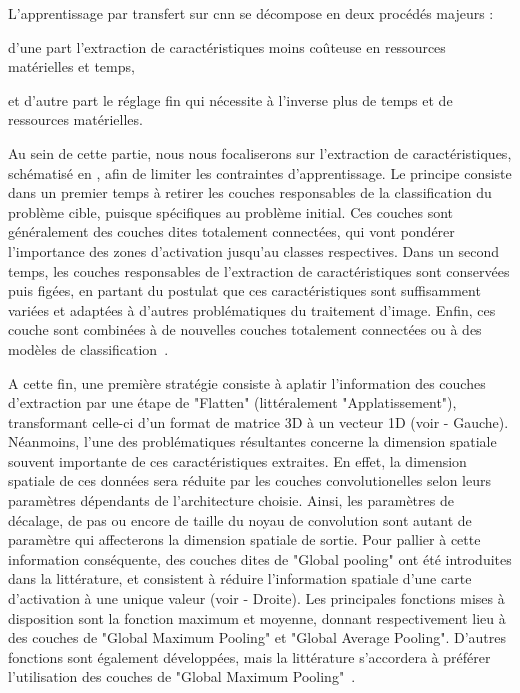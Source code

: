 L'apprentissage par transfert sur \gls{cnn} se décompose en deux procédés majeurs : 
\begin{inlinerate}
    \item d'une part l'extraction de caractéristiques moins coûteuse en ressources matérielles et temps,
    \item et d'autre part le réglage fin qui nécessite à l'inverse plus de temps et de ressources matérielles. 
\end{inlinerate}
Au sein de cette partie, nous nous focaliserons sur l'extraction de caractéristiques, schématisé en , afin de limiter les contraintes d'apprentissage. Le principe consiste dans un premier temps à retirer les couches responsables de la classification du problème cible, puisque spécifiques au problème initial. Ces couches sont généralement des couches dites totalement connectées, qui vont pondérer l'importance des zones d'activation jusqu'au classes respectives. Dans un second temps, les couches responsables de l'extraction de caractéristiques sont conservées puis figées, en partant du postulat que ces caractéristiques sont suffisamment variées et adaptées à d'autres problématiques du traitement d'image. Enfin, ces couche sont combinées à de nouvelles couches totalement connectées ou à des modèles de classification~\cite{Litjens2017}.\par 

A cette fin, une première stratégie consiste à aplatir l'information des couches d'extraction par une étape de "Flatten" (littéralement "Applatissement"), transformant celle-ci d'un format de matrice 3D à un vecteur 1D (voir  - Gauche). Néanmoins, l'une des problématiques résultantes concerne la dimension spatiale souvent importante de ces caractéristiques extraites. En effet, la dimension spatiale de ces données sera réduite par les couches convolutionelles selon leurs paramètres dépendants de l'architecture choisie. Ainsi, les paramètres de décalage, de pas ou encore de taille du noyau de convolution sont autant de paramètre qui affecterons la dimension spatiale de sortie. Pour pallier à cette information conséquente, des couches dites de "Global pooling" ont été introduites dans la littérature, et consistent à réduire l'information spatiale d'une carte d'activation à une unique valeur (voir  - Droite). Les principales fonctions mises à disposition sont la fonction maximum et moyenne, donnant respectivement lieu à des couches de "Global Maximum Pooling" et "Global Average Pooling". D'autres fonctions sont également développées, mais la littérature s'accordera à préférer l'utilisation des couches de "Global Maximum Pooling"~\cite{christlein2019}.\par

